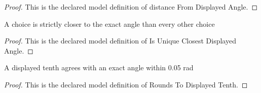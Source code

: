 \begin{proof}
  This is the declared model definition of distance From Displayed Angle.
\end{proof}
\begin{definition}
  \label{def:physics:phyx-mini-0772:phyxminiproblems-problemphyxmini0772-isuniqueclosestdisplayedangle}
  A choice is strictly closer to the exact angle than every other choice
\end{definition}
\begin{proof}
  This is the declared model definition of Is Unique Closest Displayed Angle.
\end{proof}
\begin{definition}
  \label{def:physics:phyx-mini-0772:phyxminiproblems-problemphyxmini0772-roundstodisplayedtenth}
  A displayed tenth agrees with an exact angle within 0.05 rad
\end{definition}
\begin{proof}
  This is the declared model definition of Rounds To Displayed Tenth.
\end{proof}

